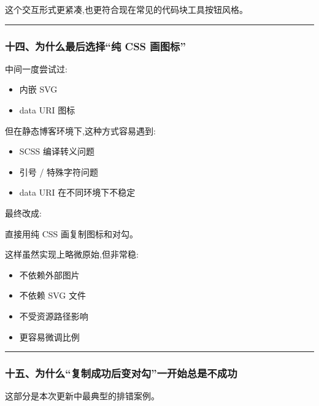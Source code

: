 \documentclass[lang=cn,scheme=chinese,color=blue,device=normal,toc=onecol,math=cm]{elegantbook}
\begin{document}
这个交互形式更紧凑,也更符合现在常见的代码块工具按钮风格。\par


\medskip\hrule\medskip


\subsubsection{十四、为什么最后选择“纯 CSS 画图标”}


中间一度尝试过:\par


\begin{itemize}
\item 内嵌 SVG
\item data URI 图标
\end{itemize}


但在静态博客环境下,这种方式容易遇到:\par


\begin{itemize}
\item SCSS 编译转义问题
\item 引号 /\allowbreak{} 特殊字符问题
\item data URI 在不同环境下不稳定
\end{itemize}


最终改成:\par


\begin{quotebox}
直接用纯 CSS 画复制图标和对勾。\par
\end{quotebox}


这样虽然实现上略微原始,但非常稳:\par


\begin{itemize}
\item 不依赖外部图片
\item 不依赖 SVG 文件
\item 不受资源路径影响
\item 更容易微调比例
\end{itemize}


\medskip\hrule\medskip


\subsubsection{十五、为什么“复制成功后变对勾”一开始总是不成功}


这部分是本次更新中最典型的排错案例。\par
\end{document}
